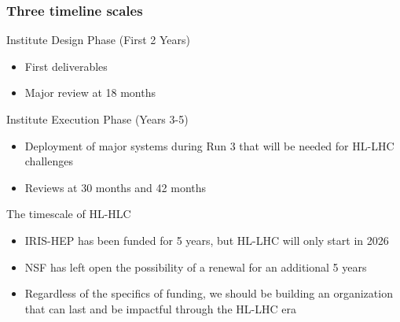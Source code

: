 \begin{frame}
\frametitle{Three timeline scales}

Institute Design Phase (First 2 Years)
\begin{itemize}
\item First deliverables
\item Major review at 18 months
\end{itemize}
\vskip 0.15in

Institute Execution Phase (Years 3-5)
\begin{itemize}
\item Deployment of major systems during Run 3 that will be needed for HL-LHC challenges
\item Reviews at 30 months and 42 months
\end{itemize}
\vskip 0.15in

The timescale of HL-HLC
\begin{itemize}
\item IRIS-HEP has been funded for 5 years, but HL-LHC will only start in 2026
\item NSF has left open the possibility of a renewal for an additional 5 years
\item Regardless of the specifics of funding, we should be building an organization that can last and be impactful through the HL-LHC era
\end{itemize}
\vskip 0.15in

\end{frame}


